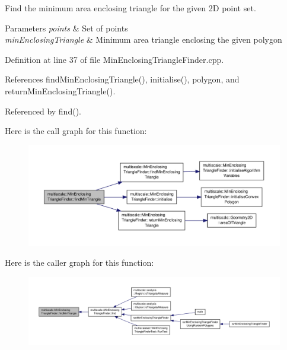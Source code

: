 Find the minimum area enclosing triangle for the given 2\-D point set. 


\begin{DoxyParams}{Parameters}
{\em points} & Set of points \\
\hline
{\em min\-Enclosing\-Triangle} & Minimum area triangle enclosing the given polygon \\
\hline
\end{DoxyParams}


Definition at line 37 of file Min\-Enclosing\-Triangle\-Finder.\-cpp.



References find\-Min\-Enclosing\-Triangle(), initialise(), polygon, and return\-Min\-Enclosing\-Triangle().



Referenced by find().



Here is the call graph for this function\-:\nopagebreak
\begin{figure}[H]
\begin{center}
\leavevmode
\includegraphics[width=350pt]{classmultiscale_1_1MinEnclosingTriangleFinder_a1540deb145740cb2e73c7c76a9dd244f_cgraph}
\end{center}
\end{figure}




Here is the caller graph for this function\-:\nopagebreak
\begin{figure}[H]
\begin{center}
\leavevmode
\includegraphics[width=350pt]{classmultiscale_1_1MinEnclosingTriangleFinder_a1540deb145740cb2e73c7c76a9dd244f_icgraph}
\end{center}
\end{figure}


